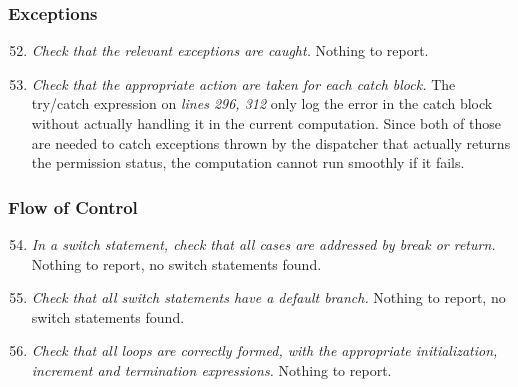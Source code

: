 	\subsubsection{Exceptions}
		\begin{enumerate}
			\setcounter{enumi}{51}
			\item \textit{Check that the relevant exceptions are caught.}\newline
			Nothing to report. %

			\item \textit{Check that the appropriate action are taken for each catch block.}
			The try/catch expression on \textit{lines 296, 312} only log the error in the catch block without actually handling it in the current computation. Since both of those are needed to catch exceptions thrown by the dispatcher that actually returns the permission status, the computation cannot run smoothly if it fails. 

		\end{enumerate}

	\subsubsection{Flow of Control}
		\begin{enumerate}
			\setcounter{enumi}{53}
			\item \textit{In a switch statement, check that all cases are addressed by break or return.}\newline
			Nothing to report, no switch statements found. %

			\item \textit{Check that all switch statements have a default branch.}\newline
			Nothing to report, no switch statements found. %

			\item \textit{Check that all loops are correctly formed, with the appropriate initialization, increment and termination expressions.}\newline
			Nothing to report. %

		\end{enumerate}

